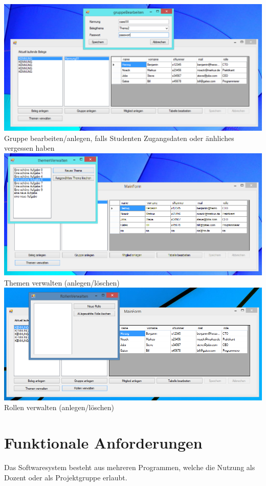 \documentclass{article}
\begin{document}
\begin{center}
    \includegraphics[scale=0.6]{bilder/doz4.PNG}\\
    Gruppe bearbeiten/anlegen, falls Studenten Zugangsdaten oder änhliches vergessen haben \\
    
    \includegraphics[scale=0.6]{bilder/doz5.PNG}\\
    Themen verwalten (anlegen/löschen) \\
    
     \includegraphics[scale=0.55]{bilder/doz6.PNG}\\
    Rollen verwalten (anlegen/löschen) \\
\end{center}

\section{Funktionale Anforderungen}
Das Softwaresystem besteht aus mehreren Programmen, welche die Nutzung als Dozent oder als Projektgruppe erlaubt.
\end{document}
